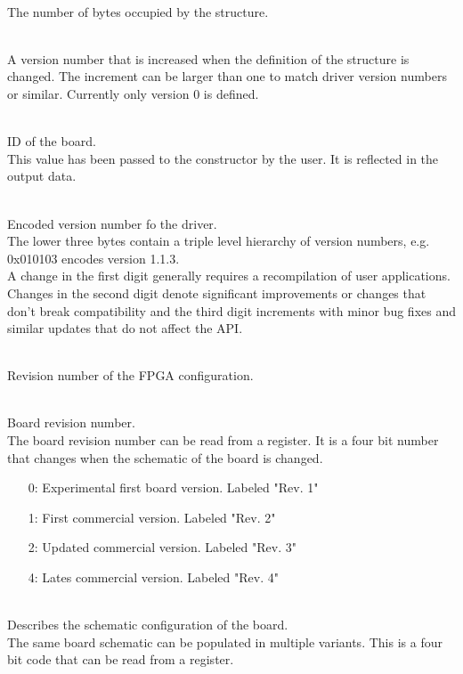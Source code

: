 			\\
			The number of bytes occupied by the structure.

			\\
			A version number that is increased when the definition of the structure is changed. The increment can be larger than one to match driver version numbers or similar. Currently only version 0 is defined.\par


			\\
			ID of the board.\\
			This value has been passed to the constructor by the user. It is reflected in the output data.\par

			\\
			Encoded version number fo the driver.\\
			The lower three bytes contain a triple level hierarchy of version numbers, e.g. 0x010103 encodes version 1.1.3.\\
			A change in the first digit generally requires a recompilation of user applications. 
			Changes in the second digit denote significant improvements or changes that don't break compatibility 
			and the third digit increments with minor bug fixes and similar updates that do not affect the API.\par

			\\
			Revision number of the FPGA configuration.

			\\
			Board revision number.\\
			The board revision number can be read from a register. It is a four bit number that changes when the schematic of the board is changed.
			\begin{itemize}
				\item[0:] Experimental first board version. Labeled "Rev. 1"
				\item[1:] First commercial version. Labeled "Rev. 2"
				\item[2:] Updated commercial version. Labeled "Rev. 3"
				\item[4:] Lates commercial version. Labeled "Rev. 4"
			\end{itemize}

			\\
			Describes the schematic configuration of the board.\\
			The same board schematic can be populated in multiple variants. This is a four bit code that can be read from a register.

